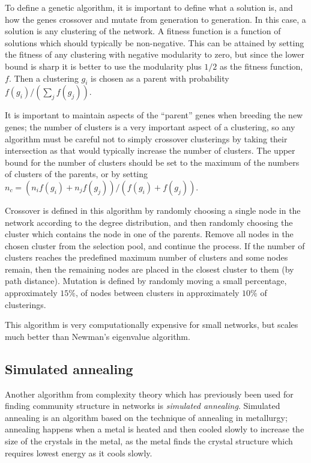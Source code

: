 To define a genetic algorithm, it is important to define what a solution is, and how the genes crossover and mutate from generation to generation. In this case, a solution is any clustering of the network.  A fitness function is a function of solutions which should typically be non-negative. This can be attained by setting the fitness of any clustering with negative modularity to zero, but since the lower bound is sharp it is better to use the modularity plus $1/2$ as the fitness function, $f$. Then a clustering $g_i$ is chosen as a parent with probability $f(g_i)/(\sum_j f(g_j))$.

It is important to maintain aspects of the ``parent'' genes when breeding the new genes; the number of clusters is a very important aspect of a clustering, so any algorithm must be careful not to simply crossover clusterings by taking their intersection as that would typically increase the number of clusters.  The upper bound for the number of clusters should be set to the maximum of the numbers of clusters of the parents, or by setting $n_c = \left(n_i f(g_i)+n_j f(g_j)\right)/(f(g_i)+f(g_j))$.

Crossover is defined in this algorithm by randomly choosing a single node in the network according to the degree distribution, and then randomly choosing the cluster which contains the node in one of the parents.  Remove all nodes in the chosen cluster from the selection pool, and continue the process.  If the number of clusters reaches the predefined maximum number of clusters and some nodes remain, then the remaining nodes are placed in the closest cluster to them (by path distance).  Mutation is defined by randomly moving a small percentage, approximately $15\%$, of nodes between clusters in approximately $10\%$ of clusterings.

This algorithm is very computationally expensive for small networks, but scales much better than Newman's eigenvalue algorithm.

\subsection{Simulated annealing}

Another algorithm from complexity theory which has previously been used for finding community structure in networks is \emph{simulated annealing}.  Simulated annealing is an algorithm based on the technique of annealing in metallurgy; annealing happens when a metal is heated and then cooled slowly to increase the size of the crystals in the metal, as the metal finds the crystal structure which requires lowest energy as it cools slowly.

